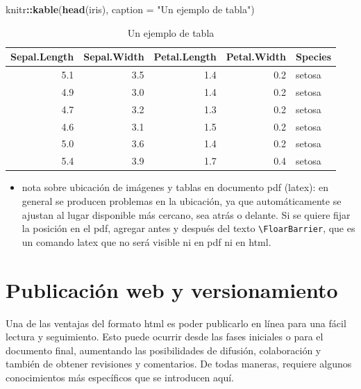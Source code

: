 \documentclass[12pt,twoside]{templates/facsothesis}
\newenvironment{Shaded}{\begin{snugshade}}{\end{snugshade}}
\newcommand{\AttributeTok}[1]{\textcolor[rgb]{0.13,0.29,0.53}{#1}}
\newcommand{\FunctionTok}[1]{\textcolor[rgb]{0.13,0.29,0.53}{\textbf{#1}}}
\newcommand{\NormalTok}[1]{#1}
\newcommand{\SpecialCharTok}[1]{\textcolor[rgb]{0.81,0.36,0.00}{\textbf{#1}}}
\newcommand{\StringTok}[1]{\textcolor[rgb]{0.31,0.60,0.02}{#1}}
\providecommand{\tightlist}{%
  \setlength{\itemsep}{0pt}\setlength{\parskip}{0pt}}
\begin{document}
\begin{Shaded}
\begin{Highlighting}[]
\NormalTok{knitr}\SpecialCharTok{::}\FunctionTok{kable}\NormalTok{(}\FunctionTok{head}\NormalTok{(iris), }\AttributeTok{caption =} \StringTok{"Un ejemplo de tabla"}\NormalTok{)}
\end{Highlighting}
\end{Shaded}

\begin{table}

\caption{\label{tab:unnamed-chunk-2}Un ejemplo de tabla}
\centering
\begin{tabular}[t]{r|r|r|r|l}
\hline
Sepal.Length & Sepal.Width & Petal.Length & Petal.Width & Species\\
\hline
5.1 & 3.5 & 1.4 & 0.2 & setosa\\
\hline
4.9 & 3.0 & 1.4 & 0.2 & setosa\\
\hline
4.7 & 3.2 & 1.3 & 0.2 & setosa\\
\hline
4.6 & 3.1 & 1.5 & 0.2 & setosa\\
\hline
5.0 & 3.6 & 1.4 & 0.2 & setosa\\
\hline
5.4 & 3.9 & 1.7 & 0.4 & setosa\\
\hline
\end{tabular}
\end{table}

\begin{itemize}
\tightlist
\item
  nota sobre ubicación de imágenes y tablas en documento pdf (latex): en general se producen problemas en la ubicación, ya que automáticamente se ajustan al lugar disponible más cercano, sea atrás o delante. Si se quiere fijar la posición en el pdf, agregar antes y después del texto \texttt{\textbackslash{}FloarBarrier}, que es un comando latex que no será visible ni en pdf ni en html.
\end{itemize}

\hypertarget{publicaciuxf3n-web-y-versionamiento}{%
\section{Publicación web y versionamiento}\label{publicaciuxf3n-web-y-versionamiento}}

Una de las ventajas del formato html es poder publicarlo en línea para una fácil lectura y seguimiento. Esto puede ocurrir desde las fases iniciales o para el documento final, aumentando las posibilidades de difusión, colaboración y también de obtener revisiones y comentarios. De todas maneras, requiere algunos conocimientos más específicos que se introducen aquí.
\end{document}
